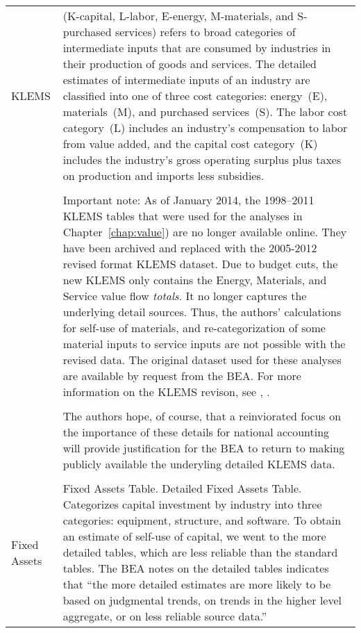 \begin{table}
\begin{center}
\begin{tabular}{l @{\hspace{2em}} p{10cm}}
KLEMS & (K-capital, L-labor, E-energy, M-materials, and S-purchased services) 
	refers to broad categories of intermediate inputs 
	that are consumed by industries in their production 
	of goods and services.\cite{Strassner:2005aa}
	The detailed estimates of intermediate inputs of an industry 
	are classified into one of three cost categories:
	energy~(E), materials~(M), and purchased services~(S).
	The labor cost category~(L) includes an industry’s compensation to labor from value added, 
	and the capital cost category~(K) includes the industry’s 
	gross operating surplus plus taxes on production and imports less subsidies.  \\
&\\
	& Important note: As of January 2014, the 1998--2011 KLEMS tables
	that were used for the analyses in Chapter~\ref{chap:value}) are 
	no longer available online. They have been archived and replaced 
	with the 2005-2012 revised format KLEMS dataset. Due to budget
	cuts, the new
	KLEMS only contains the Energy, Materials, and Service
	value flow \emph{totals}. It no longer captures the underlying detail
	sources. Thus, the authors' calculations for self-use of
	materials, and re-categorization of some material inputs
	to service inputs are not possible with the revised data.
	The original dataset used for these analyses are available
	by request from the BEA. For more information
	on the KLEMS revison, see \cite{kim2014}, \cite{BEAKLEMSData}.\\
&\\
	& The authors hope, of course, that a reinviorated focus on
	the importance of these details for national accounting
	will provide justification for the BEA to return to 
	making publicly available the underyling detailed KLEMS data.\\
 & \\
Fixed Assets &  Fixed Assets Table. Detailed Fixed Assets Table. 
	Categorizes capital investment by industry into three categories:
	equipment, structure, and software. 
	To obtain an estimate of self-use of capital, 
	we went to the more detailed tables, 
	which are less reliable than the standard tables. 
	The BEA notes on the detailed tables indicates that 
	``the more detailed estimates are more likely to be based on judgmental trends, 
	on trends in the higher level aggregate, 
	or on less reliable source data.''~\cite[Table~2.5]{BEADetailedData}\\
    \bottomrule
  \end{tabular}

\end{center}
\label{tab:data_definitions}
\end{table}

